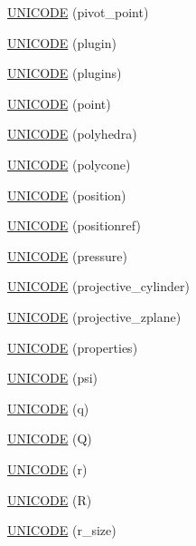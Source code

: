 \begin{DoxyCompactItemize}
\hyperlink{namespace_d_d4hep_1_1_x_m_l_afa72edab3eb25484c39069bffd6bc904}{U\+N\+I\+C\+O\+DE} (pivot\+\_\+point)
\item 
\hyperlink{namespace_d_d4hep_1_1_x_m_l_a96436b2304016932093b8c398f45655b}{U\+N\+I\+C\+O\+DE} (plugin)
\item 
\hyperlink{namespace_d_d4hep_1_1_x_m_l_a8045b45890f167a2e52bade0cb69e0b0}{U\+N\+I\+C\+O\+DE} (plugins)
\item 
\hyperlink{namespace_d_d4hep_1_1_x_m_l_a27622a43df40e123d453283bd7d6a299}{U\+N\+I\+C\+O\+DE} (point)
\item 
\hyperlink{namespace_d_d4hep_1_1_x_m_l_ac706886a7e8e345df430cefcf599474e}{U\+N\+I\+C\+O\+DE} (polyhedra)
\item 
\hyperlink{namespace_d_d4hep_1_1_x_m_l_abd7131b4e28a0f58c27412eee64879b5}{U\+N\+I\+C\+O\+DE} (polycone)
\item 
\hyperlink{namespace_d_d4hep_1_1_x_m_l_ab62b0dd1c3a8ee8b922efeacab631b71}{U\+N\+I\+C\+O\+DE} (position)
\item 
\hyperlink{namespace_d_d4hep_1_1_x_m_l_af46acbf8ffad8ee932b015566d09e903}{U\+N\+I\+C\+O\+DE} (positionref)
\item 
\hyperlink{namespace_d_d4hep_1_1_x_m_l_a295c897562467a0f3d6f86644b3f8467}{U\+N\+I\+C\+O\+DE} (pressure)
\item 
\hyperlink{namespace_d_d4hep_1_1_x_m_l_ab513f7266c526cdff63d86d83ee9f4f9}{U\+N\+I\+C\+O\+DE} (projective\+\_\+cylinder)
\item 
\hyperlink{namespace_d_d4hep_1_1_x_m_l_aa8b79772b842db484da613c5ed89043a}{U\+N\+I\+C\+O\+DE} (projective\+\_\+zplane)
\item 
\hyperlink{namespace_d_d4hep_1_1_x_m_l_a6e7b5f6dc407e16fcea4b75b29e3683e}{U\+N\+I\+C\+O\+DE} (properties)
\item 
\hyperlink{namespace_d_d4hep_1_1_x_m_l_a08057748aea5e2d33333c7d3a1f7bdb9}{U\+N\+I\+C\+O\+DE} (psi)
\item 
\hyperlink{namespace_d_d4hep_1_1_x_m_l_a95bdd403f699c09eeb71c77947ff7d59}{U\+N\+I\+C\+O\+DE} (q)
\item 
\hyperlink{namespace_d_d4hep_1_1_x_m_l_a40d06b3277e01706ffce794a886249f7}{U\+N\+I\+C\+O\+DE} (Q)
\item 
\hyperlink{namespace_d_d4hep_1_1_x_m_l_aaf712b747a42d392ce269dc44f27b203}{U\+N\+I\+C\+O\+DE} (r)
\item 
\hyperlink{namespace_d_d4hep_1_1_x_m_l_aef2bb178e2ab937c0ff31ac5bc7ee484}{U\+N\+I\+C\+O\+DE} (R)
\item 
\hyperlink{namespace_d_d4hep_1_1_x_m_l_aa68f5e3b7db9b2209492034fbe2d7f0d}{U\+N\+I\+C\+O\+DE} (r\+\_\+size)

\end{DoxyCompactItemize}

